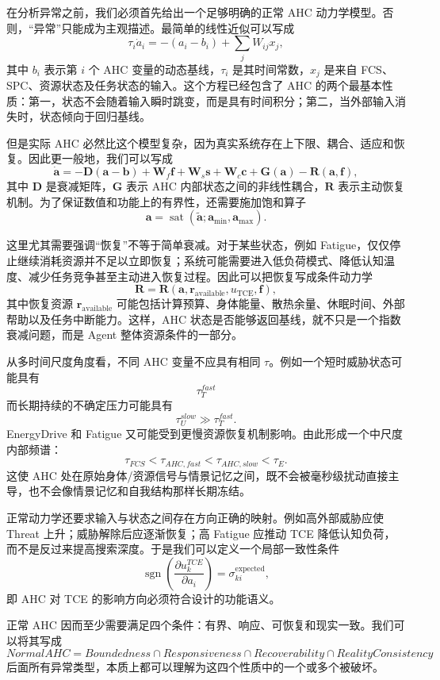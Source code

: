在分析异常之前，我们必须首先给出一个足够明确的正常 AHC 动力学模型。否则，“异常”只能成为主观描述。最简单的线性近似可以写成
\[
\tau_i\dot a_i
=
-\left(a_i-b_i\right)
+
\sum_j W_{ij}x_j,
\]
其中 $b_i$ 表示第 $i$ 个 AHC 变量的动态基线，$\tau_i$ 是其时间常数，$x_j$ 是来自 FCS、SPC、资源状态及任务状态的输入。这个方程已经包含了 AHC 的两个最基本性质：第一，状态不会随着输入瞬时跳变，而是具有时间积分；第二，当外部输入消失时，状态倾向于回归基线。

但是实际 AHC 必然比这个模型复杂，因为真实系统存在上下限、耦合、适应和恢复。因此更一般地，我们可以写成
\[
\dot{\mathbf a}
=
-\mathbf D
\left(
\mathbf a-\mathbf b
\right)
+
\mathbf W_f\mathbf f
+
\mathbf W_s\mathbf s
+
\mathbf W_c\mathbf c
+
\mathbf G(\mathbf a)
-
\mathbf R(\mathbf a,\mathbf f),
\]
其中 $\mathbf D$ 是衰减矩阵，$\mathbf G$ 表示 AHC 内部状态之间的非线性耦合，$\mathbf R$ 表示主动恢复机制。为了保证数值和功能上的有界性，还需要施加饱和算子
\[
\mathbf a
=
\operatorname{sat}
\left(
\tilde{\mathbf a};
\mathbf a_{\min},
\mathbf a_{\max}
\right).
\]

这里尤其需要强调“恢复”不等于简单衰减。对于某些状态，例如 Fatigue，仅仅停止继续消耗资源并不足以立即恢复；系统可能需要进入低负荷模式、降低认知温度、减少任务竞争甚至主动进入恢复过程。因此可以把恢复写成条件动力学
\[
\mathbf R
=
\mathbf R
\left(
\mathbf a,
\mathbf r_{\mathrm{available}},
u_{\mathrm{TCE}},
\mathbf f
\right),
\]
其中恢复资源 $\mathbf r_{\mathrm{available}}$ 可能包括计算预算、身体能量、散热余量、休眠时间、外部帮助以及任务中断能力。这样，AHC 状态是否能够返回基线，就不只是一个指数衰减问题，而是 Agent 整体资源条件的一部分。

从多时间尺度角度看，不同 AHC 变量不应具有相同 $\tau$。例如一个短时威胁状态可能具有
\[
\tau_T^{fast}
\]
而长期持续的不确定压力可能具有
\[
\tau_U^{slow}
\gg
\tau_T^{fast}.
\]
EnergyDrive 和 Fatigue 又可能受到更慢资源恢复机制影响。由此形成一个中尺度内部频谱：
\[
\tau_{FCS}
<
\tau_{AHC,fast}
<
\tau_{AHC,slow}
<
\tau_E.
\]
这使 AHC 处在原始身体/资源信号与情景记忆之间，既不会被毫秒级扰动直接主导，也不会像情景记忆和自我结构那样长期冻结。

正常动力学还要求输入与状态之间存在方向正确的映射。例如高外部威胁应使 Threat 上升；威胁解除后应逐渐恢复；高 Fatigue 应推动 TCE 降低认知负荷，而不是反过来提高搜索深度。于是我们可以定义一个局部一致性条件
\[
\operatorname{sgn}
\left(
\frac{\partial u_k^{TCE}}{\partial a_i}
\right)
=
\sigma_{ki}^{\mathrm{expected}},
\]
即 AHC 对 TCE 的影响方向必须符合设计的功能语义。

正常 AHC 因而至少需要满足四个条件：有界、响应、可恢复和现实一致。我们可以将其写成
\[
\boxed{
NormalAHC
=
Boundedness
\cap
Responsiveness
\cap
Recoverability
\cap
RealityConsistency
}
\]
后面所有异常类型，本质上都可以理解为这四个性质中的一个或多个被破坏。

